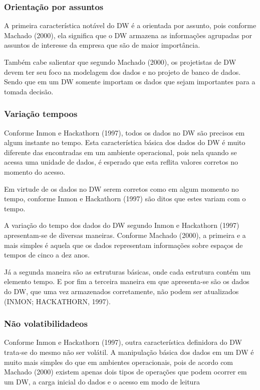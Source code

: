 \subsubsection{Orientação por assuntos}

A primeira característica notável do DW é a orientada por assunto, pois conforme Machado (2000), ela significa que o DW armazena as informações agrupadas por assuntos de interesse da empresa que são de maior importância.

Também cabe salientar que segundo Machado (2000), os projetistas de DW devem ter seu foco na modelagem dos dados e no projeto de banco de dados. Sendo que em um DW somente importam os dados que sejam importantes para a tomada decisão.

\subsubsection{Variação tempoos}

Conforme Inmon e Hackathorn (1997), todos os dados no DW são precisos em algum instante no tempo. Esta característica básica dos dados do DW é muito diferente das encontradas em um ambiente operacional, pois nela quando se acessa uma unidade de dados, é esperado que esta reflita valores corretos no momento do acesso.

Em virtude de os dados no DW serem corretos como em algum momento no tempo, conforme Inmon e Hackathorn (1997) são ditos que estes variam com o tempo.

A variação do tempo dos dados do DW segundo Inmon e Hackathorn (1997) apresentam-se de diversas maneiras. Conforme Machado (2000), a primeira e a mais simples é aquela que os dados representam informações sobre espaços de tempos de cinco a dez anos.

Já a segunda maneira são as estruturas básicas, onde cada estrutura contém um elemento tempo. E por fim a terceira maneira em que apresenta-se são os dados do DW, que uma vez armazenados corretamente, não podem ser atualizados (INMON; HACKATHORN, 1997).

\subsubsection{Não volatibilidadeos}

Conforme Inmon e Hackathorn (1997), outra característica definidora do DW trata-se do mesmo não ser volátil. A manipulação básica dos dados em um DW é muito mais simples do que em ambientes operacionais, pois de acordo com Machado (2000) existem apenas dois tipos de operações que podem ocorrer em um DW, a carga inicial do dados e o acesso em modo de leitura

